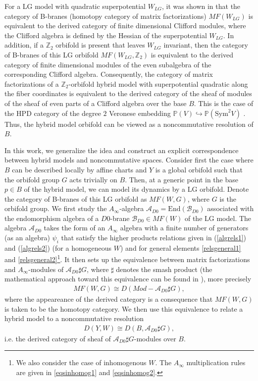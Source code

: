 \documentclass[a4paper,11pt]{article}
\def\cA{\mathcal{A}}
\newcommand{\Af}{{A_\infty}}
\numberwithin{equation}{section}
\begin{document}
For a LG model with quadratic superpotential $W_{LG}$, it was shown in 
\cite{Kapustin:2002bi} that the category of B-branes (homotopy category 
of matrix factorizations) $MF(W_{LG})$ is equivalent to the derived category of 
finite dimensional Clifford modules, where the Clifford algebra is defined by 
the Hessian of the superpotential $W_{LG}$. In addition, if a $\mathbb{Z}_2$ 
orbifold is present that leaves $W_{LG}$ invariant, then the category 
of B-branes of this LG orbifold $MF(W_{LG},\mathbb{Z}_2)$ is equivalent to the 
derived category of finite dimensional modules of the even subalgebra of the 
corresponding Clifford algebra. Consequently, the category of matrix 
factorizations of a $\mathbb{Z}_2$-orbifold hybrid model with superpotential 
quadratic along the fiber coordinates is equivalent to the derived category of 
the sheaf of modules of the sheaf of even parts of a Clifford algebra over the 
base $B$. This is 
the case of the HPD category of the degree $2$ Veronese embedding
$\mathbb{P}(V)\hookrightarrow\mathbb{P}(\mathrm{Sym}^{2}V)$ 
\cite{kuznetsov2008derived}. Thus, the hybrid model orbifold can be viewed as a 
noncommutative resolution of $B$.

In this work, we generalize the idea and construct an explicit correspondence 
between hybrid models and noncommutative spaces. Consider first the case where 
$B$ can be described locally by affine charts and $Y$ is a global orbifold such 
that the orbifold group $G$ acts trivially on $B$. Then, at a generic 
point in 
the base $p\in B$ of the hybrid model, we can model its dynamics by a LG 
orbifold. Denote the category of B-branes of this LG orbifold as $MF(W,G)$, 
where $G$ is the orbifold group. We first study the $\Af$-algebra 
$\cA_{D0}=\mathrm{End}(\mathcal{B}_{D0})$ associated with the endomorphism 
algebra of a $D0$-brane $\mathcal{B}_{D0}\in MF(W)$ of the LG model. The 
algebra $\cA_{D0}$ takes the form of an $A_{\infty}$ algebra with a finite 
number of generators (as an algebra) $\psi_{i}$ that satisfy the higher 
products relations given in (\ref{algrels1}) and (\ref{algrels2}) (for a 
homogeneous $W$) and for general elements \eqref{relsgeneral1} and 
\eqref{relsgeneral2}\footnote{We also consider the case of inhomogenous 
$W$. The $A_{\infty}$ multiplication rules are given in \eqref{eqsinhomog1} and 
\eqref{eqsinhomog2}.}. It then 
sets up the equivalence between matrix factorizations and $\Af$-modules of 
$\cA_{D0} \sharp G$, where $\sharp$ denotes the 
smash product (the mathematical approach toward this equivalence can be found 
in \cite{tu2014matrix}), more precisely
\begin{eqnarray}
MF(W,G)\cong D(Mod-\cA_{D0} \sharp G),
\end{eqnarray}
where the appeareance of the derived category is a consequence that $MF(W,G)$ 
is taken to be the homotopy category. We then use this equivalence to relate a 
hybrid model to a noncommutative resolution 
\begin{eqnarray}
D(Y,W)\cong D(B, \cA_{D0} \sharp G),
\end{eqnarray}
i.e. the 
derived category of sheaf of $\cA_{D0} \sharp G$-modules over $B$. 
\end{document}
